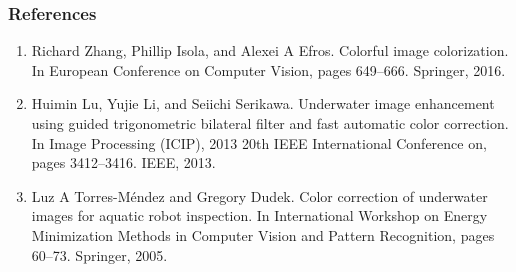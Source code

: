 \documentclass{beamer}
\begin{document}

\begin{frame}
\frametitle{\textbf{References}}
\footnotesize
\begin{enumerate}
\item Richard Zhang, Phillip Isola, and Alexei A Efros. Colorful image colorization. In European Conference on Computer Vision,
pages 649–666. Springer, 2016.
\item Huimin Lu, Yujie Li, and Seiichi Serikawa. Underwater image enhancement using guided trigonometric bilateral filter and fast
automatic color correction. In Image Processing (ICIP), 2013 20th IEEE International Conference on, pages 3412–3416. IEEE, 2013.
\item Luz A Torres-Méndez and Gregory Dudek. Color correction of underwater images for aquatic robot inspection. In International
Workshop on Energy Minimization Methods in Computer Vision and Pattern Recognition, pages 60–73. Springer, 2005.



\end{enumerate}
\end{frame}
\end{document}
